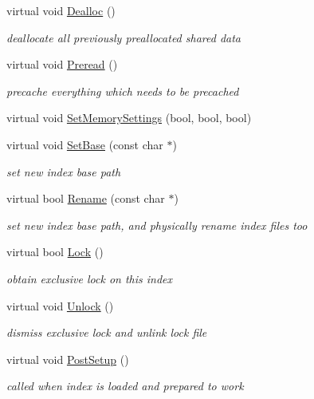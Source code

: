 \begin{DoxyCompactItemize}
virtual void \hyperlink{classCSphDummyIndex_aa5894c0a37e2d0c0048f612650cdfc32}{Dealloc} ()
\begin{DoxyCompactList}\small\item\em deallocate all previously preallocated shared data \end{DoxyCompactList}\item 
virtual void \hyperlink{classCSphDummyIndex_a78c61e3a7b8bede3990ee7dafca4402d}{Preread} ()
\begin{DoxyCompactList}\small\item\em precache everything which needs to be precached \end{DoxyCompactList}\item 
virtual void \hyperlink{classCSphDummyIndex_a61f8fcd54fa34f72cf84affcb1635822}{Set\-Memory\-Settings} (bool, bool, bool)
\item 
virtual void \hyperlink{classCSphDummyIndex_a88dcb3db2e760cd423245b88573ac8f9}{Set\-Base} (const char $\ast$)
\begin{DoxyCompactList}\small\item\em set new index base path \end{DoxyCompactList}\item 
virtual bool \hyperlink{classCSphDummyIndex_a25ab6eb1f3e2b7c315d8bbc0b2408587}{Rename} (const char $\ast$)
\begin{DoxyCompactList}\small\item\em set new index base path, and physically rename index files too \end{DoxyCompactList}\item 
virtual bool \hyperlink{classCSphDummyIndex_a9b9c193afae89019640df0078b8e7dc4}{Lock} ()
\begin{DoxyCompactList}\small\item\em obtain exclusive lock on this index \end{DoxyCompactList}\item 
virtual void \hyperlink{classCSphDummyIndex_a038f2a5405726cd9713499ca9dcb13b9}{Unlock} ()
\begin{DoxyCompactList}\small\item\em dismiss exclusive lock and unlink lock file \end{DoxyCompactList}\item 
virtual void \hyperlink{classCSphDummyIndex_a930195002116f2a5766b0a0a485aca75}{Post\-Setup} ()
\begin{DoxyCompactList}\small\item\em called when index is loaded and prepared to work \end{DoxyCompactList}\item 

\end{DoxyCompactItemize}
